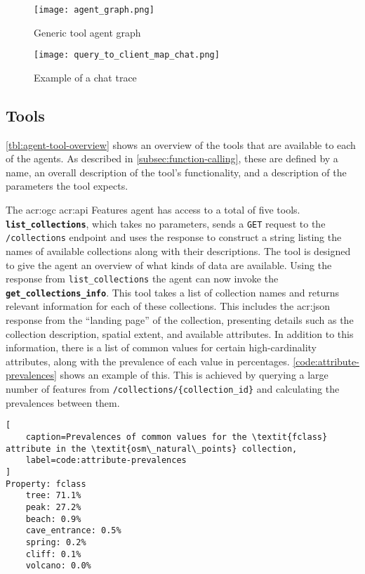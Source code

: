 \begin{figure}[H]
    \centering
    \texttt{[image: agent\_graph.png]}
    \caption{Generic tool agent graph}
    \label{fig:tool-agent-graph}
\end{figure}

\begin{figure}
    \centering
    \texttt{[image: query\_to\_client\_map\_chat.png]}
    \caption{Example of a chat trace}
    \label{fig:chat-trace-example}
\end{figure}


\subsection{Tools}
\label{subsec:tools}

\autoref{tbl:agent-tool-overview} shows an overview of the tools that are available to each of the agents. As described in \autoref{subsec:function-calling}, these are defined by a name, an overall description of the tool's functionality, and a description of the parameters the tool expects.

The \acrshort{acr:ogc} \acrshort{acr:api} Features agent has access to a total of five tools. \textbf{\texttt{list\_collections}}, which takes no parameters, sends a \texttt{GET} request to the \texttt{/collections} endpoint and uses the response to construct a string listing the names of available collections along with their descriptions. The tool is designed to give the agent an overview of what kinds of data are available. Using the response from \texttt{list\_collections} the agent can now invoke the \textbf{\texttt{get\_collections\_info}}. This tool takes a list of collection names and returns relevant information for each of these collections. This includes the \acrshort{acr:json} response from the \enquote{landing page} of the collection, presenting details such as the collection description, spatial extent, and available attributes. In addition to this information, there is a list of common values for certain high-cardinality attributes, along with the prevalence of each value in percentages. \autoref{code:attribute-prevalences} shows an example of this. This is achieved by querying a large number of features from \texttt{/collections/\{collection\_id\}} and calculating the prevalences between them.

\begin{lstlisting}[
    caption=Prevalences of common values for the \textit{fclass} attribute in the \textit{osm\_natural\_points} collection,
    label=code:attribute-prevalences
]
Property: fclass
    tree: 71.1%
    peak: 27.2%
    beach: 0.9%
    cave_entrance: 0.5%
    spring: 0.2%
    cliff: 0.1%
    volcano: 0.0%
\end{lstlisting}

